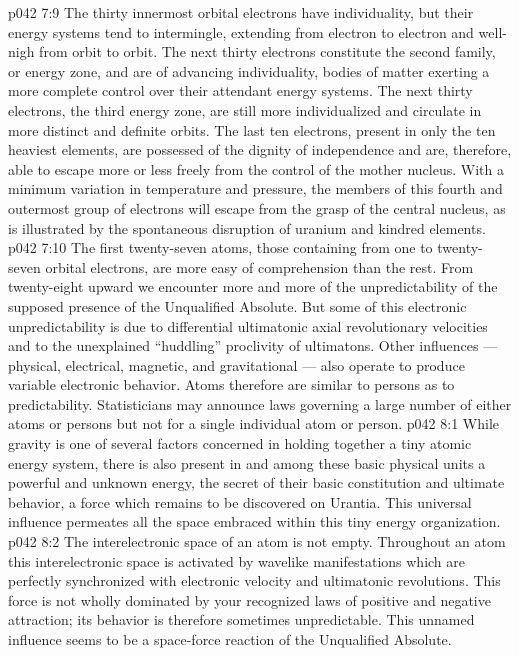 \vs p042 7:9 The thirty innermost orbital electrons have individuality, but their energy systems tend to intermingle, extending from electron to electron and well\hyp{}nigh from orbit to orbit. The next thirty electrons constitute the second family, or energy zone, and are of advancing individuality, bodies of matter exerting a more complete control over their attendant energy systems. The next thirty electrons, the third energy zone, are still more individualized and circulate in more distinct and definite orbits. The last ten electrons, present in only the ten heaviest elements, are possessed of the dignity of independence and are, therefore, able to escape more or less freely from the control of the mother nucleus. With a minimum variation in temperature and pressure, the members of this fourth and outermost group of electrons will escape from the grasp of the central nucleus, as is illustrated by the spontaneous disruption of uranium and kindred elements.
\vs p042 7:10 The first twenty\hyp{}seven atoms, those containing from one to twenty\hyp{}seven orbital electrons, are more easy of comprehension than the rest. From twenty\hyp{}eight upward we encounter more and more of the unpredictability of the supposed presence of the Unqualified Absolute. But some of this electronic unpredictability is due to differential ultimatonic axial revolutionary velocities and to the unexplained “huddling” proclivity of ultimatons. Other influences --- physical, electrical, magnetic, and gravitational --- also operate to produce variable electronic behavior. Atoms therefore are similar to persons as to predictability. Statisticians may announce laws governing a large number of either atoms or persons but not for a single individual atom or person.
\vs p042 8:1 While gravity is one of several factors concerned in holding together a tiny atomic energy system, there is also present in and among these basic physical units a powerful and unknown energy, the secret of their basic constitution and ultimate behavior, a force which remains to be discovered on Urantia. This universal influence permeates all the space embraced within this tiny energy organization.
\vs p042 8:2 The interelectronic space of an atom is not empty. Throughout an atom this interelectronic space is activated by wavelike manifestations which are perfectly synchronized with electronic velocity and ultimatonic revolutions. This force is not wholly dominated by your recognized laws of positive and negative attraction; its behavior is therefore sometimes unpredictable. This unnamed influence seems to be a space\hyp{}force reaction of the Unqualified Absolute.
